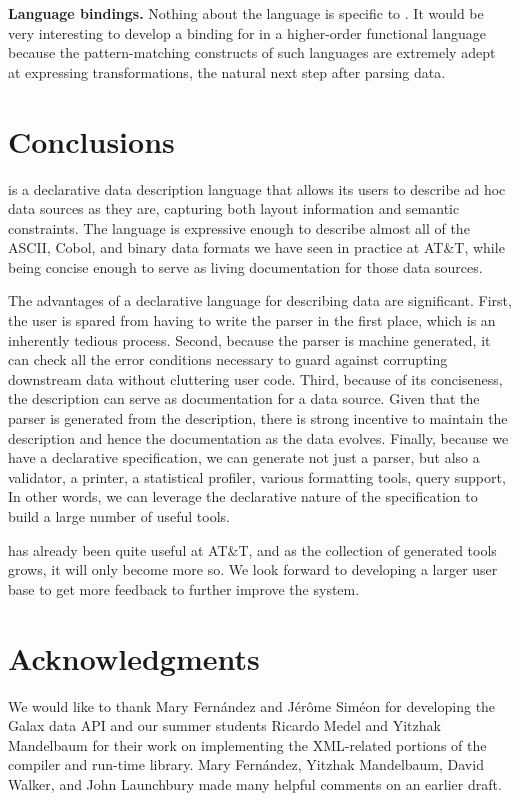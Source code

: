 \documentclass{sig-alternate}
\begin{document}
\textbf{Language bindings.}  Nothing about the \pads{} language is specific to \C{}.  It would be very interesting to develop a binding for \pads{} in a higher-order functional language because the pattern-matching constructs of such languages are extremely adept at expressing transformations, the natural next step after parsing data.


\section{Conclusions}
\pads{} is a declarative data description language that allows 
its users to describe ad hoc data sources as they are, capturing
both layout information and semantic constraints.  The language
is expressive enough to describe almost all of the ASCII, Cobol, 
and binary data formats we have seen in practice at AT\&T, while being 
concise enough to serve as living documentation for those data sources.  

The 
advantages of a declarative language for describing data are
significant.  First, the user is spared from having to write
the parser in the first place, which is an inherently tedious
process.   Second, because the parser is machine
generated, it can check all the error conditions necessary to
guard against corrupting downstream data without cluttering
user code.  Third, because of its conciseness, the \pads{}
description can serve as documentation for a data source.  Given
that the parser is generated from the description, there is 
strong incentive to maintain the description and hence the documentation
as the data evolves.  Finally, because we have a declarative
specification, we can generate not just a parser, but also
a validator, a printer, a statistical profiler, various formatting
tools, query support, \etc{}  In other words, we can leverage the declarative nature of the specification to build a large number of useful tools.

\pads{} has already been quite useful at AT\&T, and as the collection of generated tools grows, it will only become more so.  We look forward to developing a larger user base to get more feedback to further improve the system. 


\section{Acknowledgments}
We would like to thank Mary Fern\'andez and J\'er\^ome Sim\'eon for 
developing the Galax data API and our summer
students Ricardo Medel and Yitzhak Mandelbaum for their work on implementing
the XML-related portions of the \pads{} compiler and run-time library.
Mary Fern\'andez, Yitzhak Mandelbaum, David Walker, and John Launchbury made many helpful comments on an earlier draft.

\small

 
\end{document}
